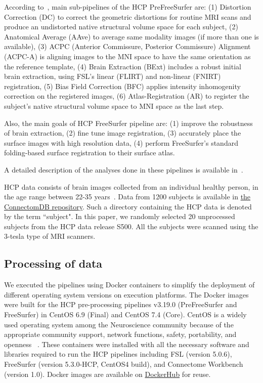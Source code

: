 \documentclass[a4paper,num-refs]{oup-contemporary}
\begin{document}
According to~\cite{glasser2013}, main sub-pipelines of the HCP PreFreeSurfer are:
(1) Distortion Correction (DC) 
to correct the geometric distortions for routine MRI scans 
and produce an undistorted native structural volume space for each subject,
(2) Anatomical Average (AAve) to average same modality images (if more than one is available),
(3) ACPC (Anterior Commissure, Posterior Commissure) Alignment (ACPC-A) 
is aligning images to the MNI space to have the same orientation as 
the reference template,
(4) Brain Extraction (BExt) includes a robust initial brain extraction, using FSL's linear (FLIRT) 
and non-linear (FNIRT) registration, 
(5) Bias Field Correction (BFC) applies intensity inhomogenity correction on the registered images, 
(6) Atlas-Registration (AR) to register the subject's native structural volume space to MNI space as the last step.

Also, the main goals of HCP FreeSurfer pipeline are:
(1) improve the robustness of brain extraction,
(2) fine tune image registration,
(3) accurately place the surface images with high resolution data,
(4) perform FreeSurfer's standard folding-based surface registration 
to their surface atlas.

A detailed description of the analyses done in these
pipelines is available in~\cite{glasser2013}. 

HCP data consists of brain images collected from an individual healthy person, 
in the age range between 22-35 years~\cite{van2013wu}. Data from 1200 subjects 
is available in \href{https://db.humanconnectome.org}{the ConnectomDB repository}. 
Such a directory containing the HCP data is denoted by the term ``subject".
In this paper, we randomly selected 20 unprocessed subjects from 
the HCP data release S500. All the subjects were scanned using the 3-tesla 
type of MRI scanners.


\subsection{Processing of data}

We executed the pipelines using Docker containers to simplify the 
deployment of different operating system versions on execution 
platforms. 
The Docker images were built for the HCP pre-processing 
pipelines v3.19.0 (PreFreeSurfer and FreeSurfer) in 
CentOS 6.9 (Final) and CentOS 7.4 (Core). 
CentOS is a widely used operating system among the Neuroscience community because of 
the appropriate community support, network functions, safety, portability, and openness
~\cite{hanke2011neuroscience}.
These containers were installed with all the necessary software and libraries 
required to run the HCP pipelines including FSL (version 5.0.6), 
FreeSurfer (version 5.3.0-HCP, CentOS4 build), and Connectome Workbench (version 1.0).
Docker images are available on 
\href{https://hub.docker.com/r/bigdatalabteam/hcp-prefreesurfer/}{DockerHub}
for reuse.
\end{document}

